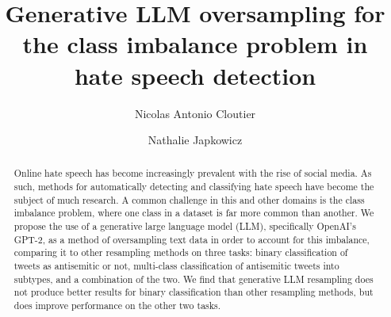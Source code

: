 \documentclass[runningheads]{llncs}
\begin{document}
\makeatletter
\renewcommand\section{\@startsection{section}{1}{\z@}%
                       {-10\p@}%
                       {8\p@ }%
                       {\normalfont\large\bfseries\boldmath
                        \rightskip=\z@ \@plus 8em\pretolerance=10000 }}
\renewcommand\subsection{\@startsection{subsection}{2}{\z@}%
                       {-9\p@ }%
                       {7\p@ }%
                       {\normalfont\normalsize\bfseries\boldmath
                        \rightskip=\z@ \@plus 8em\pretolerance=10000 }}
\renewcommand\subsubsection{\@startsection{subsubsection}{3}{\z@}%
                       {-5\p@ }%
                       {-2em }%
                       {\normalfont\normalsize\bfseries\boldmath}}
\makeatother

\setlength{\textfloatsep}{0pt plus 0pt minus 0pt}
\setlength{\intextsep}{0pt plus 0pt minus 0pt}
 \setlength{\parskip}{0pt plus 0pt minus 0pt}

\title{Generative LLM oversampling for the class imbalance problem in hate speech detection}
\author{Nicolas Antonio Cloutier \and Nathalie Japkowicz}


\maketitle 

\begin{abstract}
Online hate speech has become increasingly prevalent with the rise of social media. As such, methods for automatically detecting and classifying hate speech have become the subject of much research. A common challenge in this and other domains is the class imbalance problem, where one class in a dataset is far more common than another. We propose the use of a generative large language model (LLM), specifically OpenAI's GPT-2, as a method of oversampling text data in order to account for this imbalance, comparing it to other resampling methods on three tasks: binary classification of tweets as antisemitic or not, multi-class classification of antisemitic tweets into subtypes, and a combination of the two. We find that generative LLM resampling does not produce better results for binary classification than other resampling methods, but does improve performance on the other two tasks.
\end{abstract}
\end{document}
